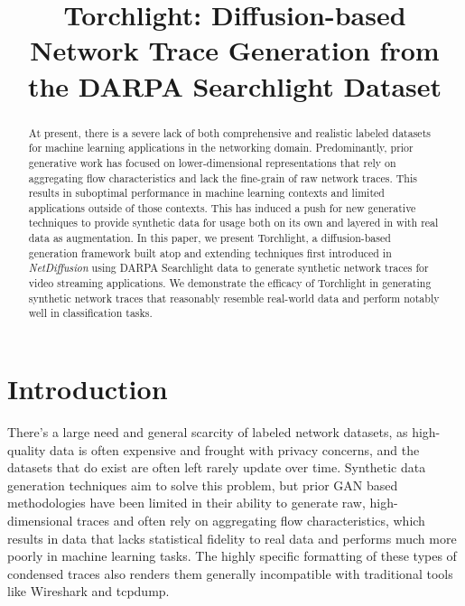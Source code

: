 \documentclass[sigconf, nonacm]{acmart}
\begin{document}
\title{Torchlight: Diffusion-based Network Trace Generation from the DARPA Searchlight Dataset}



\renewcommand{\shortauthors}{Zhao, Hussain}

\begin{abstract}
  At present, there is a severe lack of both comprehensive and realistic labeled datasets
  for machine learning applications in the networking domain. Predominantly, prior generative
  work has focused on lower-dimensional representations that rely on aggregating flow 
  characteristics and lack the fine-grain of raw network traces. This results in suboptimal
  performance in machine learning contexts and limited applications outside of those 
  contexts. This has induced a push for new generative techniques to provide 
  synthetic data for usage both on its own and layered in with real data as augmentation.
  In this paper, we present Torchlight, a diffusion-based
  generation framework built atop and extending techniques first introduced in 
  \textit{NetDiffusion} \cite{jiang2024netdiffusion} using DARPA Searchlight 
  \cite{ardi2022} data to generate synthetic network traces
  for video streaming applications. We demonstrate the efficacy of Torchlight in generating
  synthetic network traces that reasonably resemble real-world data and perform notably well
  in classification tasks. 
\end{abstract}

\maketitle

\section{Introduction}
There's a large need and general scarcity of labeled network datasets,
as high-quality data is often expensive and frought with privacy concerns,
and the datasets that do exist are often left rarely update over time.
Synthetic data generation techniques aim to solve this problem, but prior
GAN based methodologies have been limited in their ability to generate
raw, high-dimensional traces and often rely on aggregating flow characteristics,
which results in data that lacks statistical fidelity to real data and performs
much more poorly in machine learning tasks. The highly specific formatting of
these types of condensed traces also renders them generally incompatible with
traditional tools like Wireshark and tcpdump.
\end{document}
